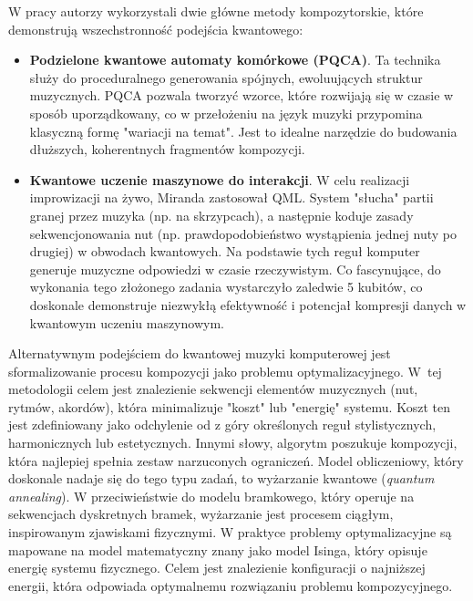 W pracy \cite{miranda2022quantum} autorzy wykorzystali dwie główne metody kompozytorskie, które demonstrują wszechstronność podejścia kwantowego:
\begin{itemize}

    \item \textbf{Podzielone kwantowe automaty komórkowe (PQCA)}. Ta technika służy do proceduralnego generowania spójnych, ewoluujących struktur muzycznych. PQCA pozwala tworzyć wzorce, które rozwijają się w czasie w sposób uporządkowany, co w przełożeniu na język muzyki przypomina klasyczną formę "wariacji na temat". Jest to idealne narzędzie do budowania dłuższych, koherentnych fragmentów kompozycji.

    \item \textbf{Kwantowe uczenie maszynowe do interakcji}. W celu realizacji improwizacji na żywo, Miranda zastosował QML. System "słucha" partii granej przez muzyka (np. na skrzypcach), a następnie koduje zasady sekwencjonowania nut (np. prawdopodobieństwo wystąpienia jednej nuty po drugiej) w obwodach kwantowych. Na podstawie tych reguł komputer generuje muzyczne odpowiedzi w czasie rzeczywistym. Co fascynujące, do wykonania tego złożonego zadania wystarczyło zaledwie 5 kubitów, co doskonale demonstruje niezwykłą efektywność i potencjał kompresji danych w kwantowym uczeniu maszynowym.
\end{itemize}

Alternatywnym podejściem do kwantowej muzyki komputerowej jest sformalizowanie procesu kompozycji jako problemu optymalizacyjnego. W~tej metodologii celem jest znalezienie sekwencji elementów muzycznych (nut, rytmów, akordów), która minimalizuje "koszt" lub "energię" systemu. Koszt ten jest zdefiniowany jako odchylenie od z góry określonych reguł stylistycznych, harmonicznych lub estetycznych\cite{salehi2025music}. Innymi słowy, algorytm poszukuje kompozycji, która najlepiej spełnia zestaw narzuconych ograniczeń.
Model obliczeniowy, który doskonale nadaje się do tego typu zadań, to wyżarzanie kwantowe (\textit{quantum annealing}). W przeciwieństwie do modelu bramkowego, który operuje na sekwencjach dyskretnych bramek, wyżarzanie jest procesem ciągłym, inspirowanym zjawiskami fizycznymi. W praktyce problemy optymalizacyjne są mapowane na model matematyczny znany jako model Isinga, który opisuje energię systemu fizycznego\cite{arya2022music}. Celem jest znalezienie konfiguracji o najniższej energii, która odpowiada optymalnemu rozwiązaniu problemu kompozycyjnego.

